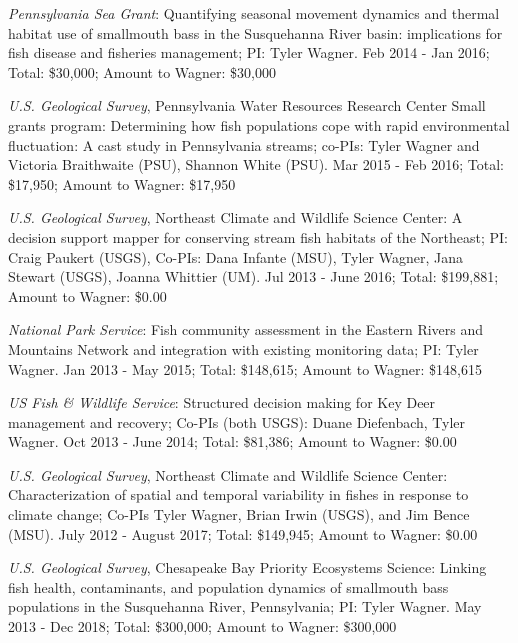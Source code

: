 \documentclass[10pt]{article}
\begin{document}
\begin{flushleft}
\begin{etaremune}
\item {\sl Pennsylvania Sea Grant}: Quantifying seasonal movement dynamics and thermal habitat use of smallmouth bass in the Susquehanna River basin: implications for fish disease and fisheries management; PI: Tyler Wagner. Feb 2014 - Jan 2016; Total: \$30,000; Amount to Wagner: \$30,000

\item {\sl U.S. Geological Survey}, Pennsylvania Water Resources Research Center Small grants program: Determining how fish populations cope with rapid environmental fluctuation: A cast study in Pennsylvania streams; co-PIs: Tyler Wagner and Victoria Braithwaite (PSU), Shannon White (PSU). Mar 2015 - Feb 2016; Total: \$17,950; Amount to Wagner: \$17,950

\item {\sl U.S. Geological Survey}, Northeast Climate and Wildlife Science Center: A decision support mapper for conserving stream fish habitats of the Northeast; PI: Craig Paukert (USGS), Co-PIs: Dana Infante (MSU), Tyler Wagner, Jana Stewart (USGS), Joanna Whittier (UM). Jul 2013 - June 2016; Total: \$199,881; Amount to Wagner: \$0.00

\item {\sl National Park Service}: Fish community assessment in the Eastern Rivers and Mountains Network and integration with existing monitoring data; PI: Tyler Wagner. Jan 2013 - May 2015;  Total: \$148,615; Amount to Wagner: \$148,615

\item {\sl US Fish \& Wildlife Service}: Structured decision making for Key Deer management and recovery; Co-PIs (both USGS): Duane Diefenbach, Tyler Wagner. Oct 2013 - June 2014; Total: \$81,386; Amount to Wagner: \$0.00

\item {\sl U.S. Geological Survey}, Northeast Climate and Wildlife Science Center: Characterization of spatial and temporal variability in fishes in response to climate change; Co-PIs Tyler Wagner, Brian Irwin (USGS), and Jim Bence (MSU). July 2012 - August 2017; Total: \$149,945; Amount to Wagner: \$0.00

\item {\sl  U.S. Geological Survey},  Chesapeake Bay Priority Ecosystems Science: Linking fish health, contaminants, and population dynamics of smallmouth bass populations in the Susquehanna River, Pennsylvania; PI: Tyler Wagner. May 2013 - Dec 2018; Total: \$300,000; Amount to Wagner: \$300,000


\end{etaremune}
\end{flushleft}
\end{document}
